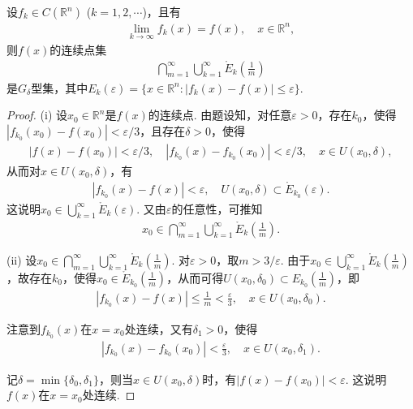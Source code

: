 \documentclass[../../main.tex]{subfiles}%
\begin{document}
\begin{example}\label{example:例12}
设$f_k\in C(\mathbb{R}^n)$ ($k = 1,2,\cdots$)，且有
\begin{align*}
\lim_{k\to\infty}f_k(x)=f(x), \quad x\in\mathbb{R}^n,
\end{align*}
则$f(x)$的连续点集
\begin{align*}
\bigcap_{m = 1}^{\infty}\bigcup_{k = 1}^{\infty}\mathring{E}_k\left(\frac{1}{m}\right)
\end{align*}
是$G_{\delta}$型集，其中$E_k(\varepsilon)=\{x\in\mathbb{R}^n: |f_k(x)-f(x)|\leqslant\varepsilon\}$.
\end{example}
\begin{proof}

(i) 设$x_0\in\mathbb{R}^n$是$f(x)$的连续点. 由题设知，对任意$\varepsilon>0$，存在$k_0$，使得$|f_{k_0}(x_0)-f(x_0)|<\varepsilon/3$，且存在$\delta>0$，使得
\begin{align*}
|f(x)-f(x_0)|<\varepsilon/3, \quad |f_{k_0}(x)-f_{k_0}(x_0)|<\varepsilon/3, \quad x\in U(x_0,\delta),
\end{align*}
从而对$x\in U(x_0,\delta)$，有
\begin{align*}
|f_{k_0}(x)-f(x)|<\varepsilon, \quad U(x_0,\delta)\subset\mathring{E}_{k_0}(\varepsilon).
\end{align*}
这说明$x_0\in\bigcup_{k = 1}^{\infty}\mathring{E}_k(\varepsilon)$. 又由$\varepsilon$的任意性，可推知
\begin{align*}
x_0\in\bigcap_{m = 1}^{\infty}\bigcup_{k = 1}^{\infty}\mathring{E}_k\left(\frac{1}{m}\right).
\end{align*}

(ii) 设$x_0\in\bigcap_{m = 1}^{\infty}\bigcup_{k = 1}^{\infty}\mathring{E}_k\left(\frac{1}{m}\right)$. 对$\varepsilon>0$，取$m>3/\varepsilon$. 由于$x_0\in\bigcup_{k = 1}^{\infty}\mathring{E}_k\left(\frac{1}{m}\right)$，故存在$k_0$，使得$x_0\in\mathring{E}_{k_0}\left(\frac{1}{m}\right)$，从而可得$U(x_0,\delta_0)\subset E_{k_0}\left(\frac{1}{m}\right)$，即
\begin{align*}
|f_{k_0}(x)-f(x)|\leqslant\frac{1}{m}<\frac{\varepsilon}{3}, \quad x\in U(x_0,\delta_0).
\end{align*}

注意到$f_{k_0}(x)$在$x = x_0$处连续，又有$\delta_1>0$，使得
\begin{align*}
|f_{k_0}(x)-f_{k_0}(x_0)|<\frac{\varepsilon}{3}, \quad x\in U(x_0,\delta_1).
\end{align*}

记$\delta=\min\{\delta_0,\delta_1\}$，则当$x\in U(x_0,\delta)$时，有$|f(x)-f(x_0)|<\varepsilon$. 这说明$f(x)$在$x = x_0$处连续. 

\end{proof}
\end{document}
